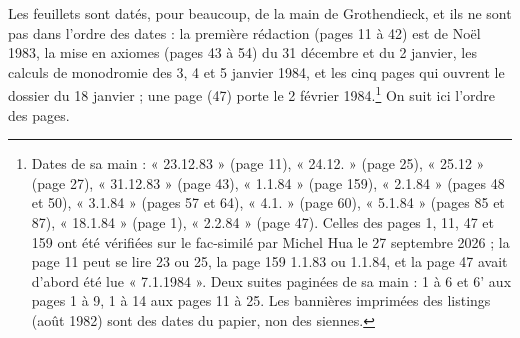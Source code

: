 \documentclass[11pt,a4paper]{article}
\begin{document}
Les feuillets sont datés, pour beaucoup, de la main de Grothendieck, et ils ne
sont pas dans l'ordre des dates : la première rédaction (pages 11 à 42) est de
Noël 1983, la mise en axiomes (pages 43 à 54) du 31 décembre et du 2 janvier,
les calculs de monodromie des 3, 4 et 5 janvier 1984, et les cinq pages qui
ouvrent le dossier du 18 janvier ; une page (47) porte le 2 février
1984.\footnote{Dates de sa main : « 23.12.83 » (page 11), « 24.12. » (page 25),
« 25.12 » (page 27), « 31.12.83 » (page 43), « 1.1.84 » (page 159), « 2.1.84 »
(pages 48 et 50), « 3.1.84 » (pages 57 et 64), « 4.1. » (page 60), « 5.1.84 »
(pages 85 et 87), « 18.1.84 » (page 1), « 2.2.84 » (page 47). Celles des pages
1, 11, 47 et 159 ont été vérifiées sur le fac-similé par Michel Hua le 27
septembre 2026 ; la page 11 peut se lire 23 ou 25, la page 159 1.1.83 ou
1.1.84, et la page 47 avait d'abord été lue « 7.1.1984 ». Deux suites
paginées de sa main : 1 à 6 et 6' aux pages 1 à 9, 1 à 14 aux pages 11 à 25.
Les bannières imprimées des listings (août 1982) sont des dates du papier, non
des siennes.} On suit ici l'ordre des pages.
\end{document}
